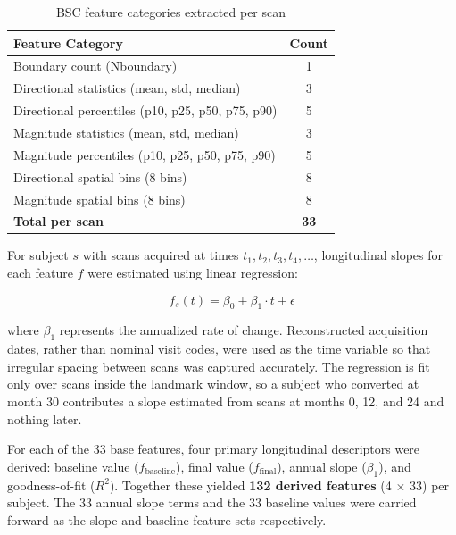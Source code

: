 \documentclass[blue]{ludusofficial}  %
\begin{document}
\begin{table}[htbp]
\centering
\caption{BSC feature categories extracted per scan}
\label{tab:bsc-features}
\begin{tabular}{lc}
\hline
\textbf{Feature Category} & \textbf{Count} \\
\hline
Boundary count (Nboundary) & 1 \\
Directional statistics (mean, std, median) & 3 \\
Directional percentiles (p10, p25, p50, p75, p90) & 5 \\
Magnitude statistics (mean, std, median) & 3 \\
Magnitude percentiles (p10, p25, p50, p75, p90) & 5 \\
Directional spatial bins (8 bins) & 8 \\
Magnitude spatial bins (8 bins) & 8 \\
\hline
\textbf{Total per scan} & \textbf{33} \\
\hline
\end{tabular}
\end{table}

For subject $s$ with scans acquired at times $t_1, t_2, t_3, t_4, \ldots$, longitudinal slopes for each feature $f$ were estimated using linear regression:

\begin{equation}
    f_s(t) = \beta_0 + \beta_1 \cdot t + \epsilon
\end{equation}

where $\beta_1$ represents the annualized rate of change. Reconstructed acquisition dates, rather than nominal visit codes, were used as the time variable so that irregular spacing between scans was captured accurately. The regression is fit only over scans inside the landmark window, so a subject who converted at month 30 contributes a slope estimated from scans at months 0, 12, and 24 and nothing later.

For each of the 33 base features, four primary longitudinal descriptors were derived: baseline value ($f_{\text{baseline}}$), final value ($f_{\text{final}}$), annual slope ($\beta_1$), and goodness-of-fit ($R^2$). Together these yielded \textbf{132 derived features} (4 $\times$ 33) per subject. The 33 annual slope terms and the 33 baseline values were carried forward as the slope and baseline feature sets respectively.
\end{document}
